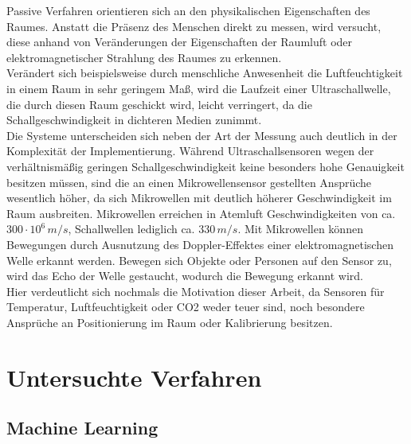 Passive Verfahren orientieren sich an den physikalischen Eigenschaften des Raumes. Anstatt die Präsenz des 
Menschen direkt zu messen, wird versucht, diese anhand von Veränderungen der Eigenschaften der Raumluft oder 
elektromagnetischer Strahlung des Raumes zu erkennen. \\
Verändert sich beispielsweise durch menschliche Anwesenheit die Luftfeuchtigkeit 
in einem Raum in sehr geringem Maß, wird die  Laufzeit einer Ultraschallwelle, die durch diesen Raum 
geschickt wird, leicht verringert, da die Schallgeschwindigkeit in dichteren Medien zunimmt.\\
Die Systeme unterscheiden sich neben der Art der Messung auch deutlich in der Komplexität der Implementierung.
Während Ultraschallsensoren wegen der verhältnismäßig geringen Schallgeschwindigkeit keine besonders hohe 
Genauigkeit besitzen müssen, sind die an einen Mikrowellensensor gestellten Ansprüche wesentlich höher, da sich
Mikrowellen mit deutlich höherer Geschwindigkeit im Raum ausbreiten. Mikrowellen erreichen in Atemluft Geschwindigkeiten
von ca. $300\cdot10^6 \,m/s$, Schallwellen lediglich ca. $330\, m/s$.
Mit Mikrowellen können Bewegungen durch Ausnutzung des Doppler-Effektes einer elektromagnetischen Welle erkannt 
werden. Bewegen sich Objekte oder Personen auf den Sensor zu, wird das Echo der Welle gestaucht, wodurch die 
Bewegung erkannt wird.\\
Hier verdeutlicht sich nochmals die Motivation dieser Arbeit, da Sensoren für Temperatur, Luftfeuchtigkeit oder CO2
weder teuer sind, noch besondere Ansprüche an Positionierung im Raum oder Kalibrierung besitzen.

\chapter{\textbf{Untersuchte Verfahren}}

\section{Machine Learning}\label{unterkapitel}

